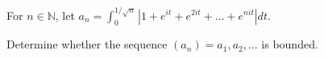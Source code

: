 For $n \in \mathbb{N}$, let $\displaystyle a_n = \int_0^{1/\sqrt{n}} |1 +
e^{it} + e^{2it} + \dots + e^{nit}| dt$.

Determine whether the sequence $(a_n) = a_1, a_2, \dots$ is bounded.
